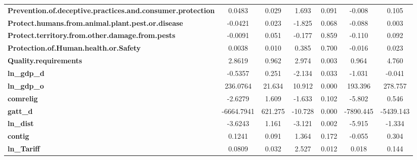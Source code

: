 \begin{center}
\begin{tabular}{lcccccc}
\textbf{Prevention.of.deceptive.practices.and.consumer.protection} &       0.0483  &        0.029     &     1.693  &         0.091        &       -0.008    &        0.105     \\
\textbf{Protect.humans.from.animal.plant.pest.or.disease}          &      -0.0421  &        0.023     &    -1.825  &         0.068        &       -0.088    &        0.003     \\
\textbf{Protect.territory.from.other.damage.from.pests}            &      -0.0091  &        0.051     &    -0.177  &         0.859        &       -0.110    &        0.092     \\
\textbf{Protection.of.Human.health.or.Safety}                      &       0.0038  &        0.010     &     0.385  &         0.700        &       -0.016    &        0.023     \\
\textbf{Quality.requirements}                                      &       2.8619  &        0.962     &     2.974  &         0.003        &        0.964    &        4.760     \\
\textbf{ln\_gdp\_d}                                                &      -0.5357  &        0.251     &    -2.134  &         0.033        &       -1.031    &       -0.041     \\
\textbf{ln\_gdp\_o}                                                &     236.0764  &       21.634     &    10.912  &         0.000        &      193.396    &      278.757     \\
\textbf{comrelig}                                                  &      -2.6279  &        1.609     &    -1.633  &         0.102        &       -5.802    &        0.546     \\
\textbf{gatt\_d}                                                   &   -6664.7941  &      621.275     &   -10.728  &         0.000        &    -7890.445    &    -5439.143     \\
\textbf{ln\_dist}                                                  &      -3.6243  &        1.161     &    -3.121  &         0.002        &       -5.915    &       -1.334     \\
\textbf{contig}                                                    &       0.1241  &        0.091     &     1.364  &         0.172        &       -0.055    &        0.304     \\
\textbf{ln\_Tariff}                                                &       0.0809  &        0.032     &     2.527  &         0.012        &        0.018    &        0.144     \\

\end{tabular}
\end{center}
